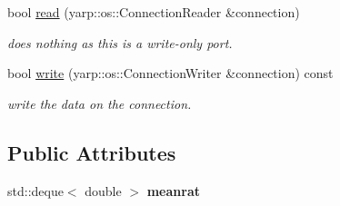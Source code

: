 \begin{DoxyCompactItemize}
\item 
bool \hyperlink{classev_1_1vGenPortInterface_a2ff6470725bcce8d38ff95e072d5f7bb}{read} (yarp\+::os\+::\+Connection\+Reader \&connection)\hypertarget{classev_1_1vGenPortInterface_a2ff6470725bcce8d38ff95e072d5f7bb}{}\label{classev_1_1vGenPortInterface_a2ff6470725bcce8d38ff95e072d5f7bb}

\begin{DoxyCompactList}\small\item\em does nothing as this is a write-\/only port. \end{DoxyCompactList}\item 
bool \hyperlink{classev_1_1vGenPortInterface_ae7fa26e89b1f5501aaf1263d9e9f8aa7}{write} (yarp\+::os\+::\+Connection\+Writer \&connection) const \hypertarget{classev_1_1vGenPortInterface_ae7fa26e89b1f5501aaf1263d9e9f8aa7}{}\label{classev_1_1vGenPortInterface_ae7fa26e89b1f5501aaf1263d9e9f8aa7}

\begin{DoxyCompactList}\small\item\em write the data on the connection. \end{DoxyCompactList}\end{DoxyCompactItemize}
\subsection*{Public Attributes}
\begin{DoxyCompactItemize}
\item 
std\+::deque$<$ double $>$ {\bfseries meanrat}\hypertarget{classev_1_1vGenPortInterface_abf2f01a37f49d51a0affcfd740dda299}{}\label{classev_1_1vGenPortInterface_abf2f01a37f49d51a0affcfd740dda299}

\end{DoxyCompactItemize}
